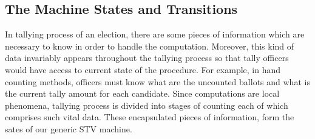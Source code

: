 \documentclass{llncs}
\begin{document}

\subsection{The Machine States and Transitions}
In tallying process of an election, there are some pieces of information which are necessary to know in order to handle the computation. Moreover, this  kind of data invariably appears throughout the tallying process so that tally officers would have access to current state of the procedure. For example, in hand counting methods, officers must know what are the uncounted ballots and what is the current tally amount for each candidate. Since computations are local phenomena, tallying process is divided into stages of counting each of which comprises such vital data. These encapsulated pieces of information, form the sates of our generic STV machine. 
\end{document}

